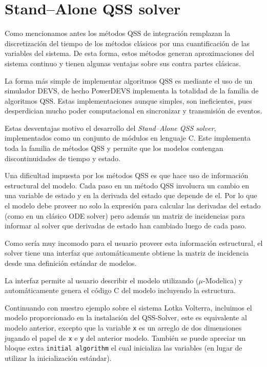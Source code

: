 \section{Stand–Alone QSS solver}
	Como mencionamos antes los métodos QSS de integración remplazan la discretización del tiempo de los métodos clásicos por una cuantificación de las 
	variables del sistema. De esta forma, estos métodos generan aproximaciones del sistema continuo y tienen algunas ventajas sobre sus contra partes clásicas.

	La forma más simple de implementar algoritmos QSS es mediante el uso de un simulador DEVS, de hecho PowerDEVS implementa la totalidad de la familia de 
	algoritmos QSS. Estas implementaciones aunque simples, son ineficientes, pues desperdician mucho poder computacional en sincronizar y transmisión de eventos.

	Estas desventajas motivo el desarrollo del \emph{Stand–Alone QSS solver}\cite{Ber12}, implementados como un conjunto de módulos en lenguaje C. Este implementa 
	toda la familia de métodos QSS y permite que los modelos contengan discontinuidades de tiempo y estado.

	Una dificultad impuesta por los métodos QSS es que hace uso de información estructural del modelo. Cada paso en un método QSS involucra un cambio 
	en una variable de estado y en la derivada del estado que depende de el. Por lo que el modelo debe proveer no solo la expresión para calcular las 
	derivadas del estado (como en un clásico ODE solver) pero además un matriz de incidencias para informar al solver que derivadas de estado han cambiado 
	luego de cada paso.

	Como sería muy incomodo para el usuario proveer esta información estructural, el solver tiene una interfaz que automáticamente obtiene la matriz de
	 incidencia desde una definición estándar de modelos.

	La interfaz permite al usuario describir el modelo utilizando ($\mu$-Modelica) y automáticamente genera el código C del modelo incluyendo la estructura.

	Continuando con nuestro ejemplo sobre el sistema Lotka Volterra, incluimos el modelo proporcionado en la instalación del QSS-Solver, este es equivalente 
	al modelo anterior, excepto que la variable \texttt{x} es un arreglo de dos dimensiones jugando el papel de \texttt{x} e \texttt{y} del anterior modelo.
	También se puede apreciar un bloque extra \texttt{initial algorithm} el cual inicializa las variables (en lugar de utilizar la inicialización estándar).

